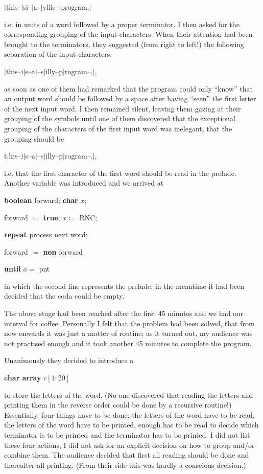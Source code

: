 \quad $\mid$this--$\mid$si--$\mid$a--$\mid$yllis--$\mid$program.$\mid$

\noindent
i.e. in units of a word followed by a proper terminator. I then asked for the corresponding grouping of the input characters. When their attention had been brought to the terminators, they suggested (from right to left!) the following separation of the input characters:

\quad $\mid$this--i$\mid$s--a$\mid$--s$\mid$illy--p$\mid$rogram--.$\mid$,

\noindent
as soon as one of them had remarked that the program could only ``know'' that an output word should be followed by a space after having ``seen'' the first letter of the next input word. I then remained silent, leaving them gazing at their grouping of the symbols until one of them discovered that the exceptional grouping of the characters of the first input word was inelegant, that the grouping should be

\quad t$\mid$his--i$\mid$s--a$\mid$--s$\mid$illy--p$\mid$rogram--.$\mid$,

\noindent
i.e. that the first character of the first word should be read in the prelude. Another variable was introduced and we arrived at

\quad \textbf{boolean} forward; \textbf{char} $x$;

\quad forward $\coloneq$ \textbf{true}; $x \coloneq$ RNC;

\quad \textbf{repeat} process next word;

\quad \quad forward $\coloneq$ \textbf{non} forward

\quad \textbf{until} $x =$ pnt

\noindent
in which the second line represents the prelude; in the meantime it had been decided that the coda could be empty.

The above stage had been reached after the first 45 minutes and we had our interval for coffee. Personally I felt that the problem had been solved, that from now onwards it was just a matter of routine; as it turned out, my audience was not practised enough and it took another 45 minutes to complete the program.

Unanimously they decided to introduce a

\quad \textbf{char array} $c[1:20]$

\noindent
to store the letters of the word. (No one discovered that reading the letters and printing them in the reverse order could be done by a recursive routine!) Essentially, four things have to be done: the letters of the word have to be read, the letters of the word have to be printed, enough has to be read to decide which terminator is to be printed and the terminator has to be printed. I did not list these four actions, I did not ask for an explicit decision on how to group and/or combine them. The audience decided that first all reading should be done and thereafter all printing. (From their side this was hardly a conscious decision.)

